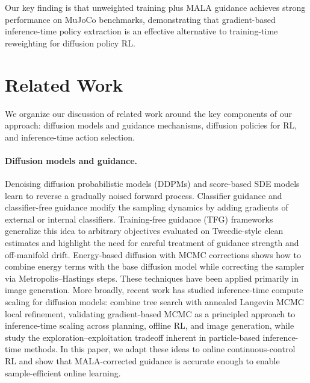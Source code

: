 \documentclass{article}
\theoremstyle{plain}
\theoremstyle{definition}
\theoremstyle{remark}
\begin{document}
Our key finding is that unweighted training plus MALA guidance achieves strong performance on MuJoCo benchmarks, demonstrating that gradient-based inference-time policy extraction is an effective alternative to training-time reweighting for diffusion policy RL.

\section{Related Work}
\label{sec:related}

We organize our discussion of related work around the key components of our approach: diffusion models and guidance mechanisms, diffusion policies for RL, and inference-time action selection.

\paragraph{Diffusion models and guidance.}
Denoising diffusion probabilistic models (DDPMs) \citep{ho2020denoising} and score-based SDE models \citep{song2021sde} learn to reverse a gradually noised forward process.
Classifier guidance \citep{dhariwal2021beatgans} and classifier-free guidance \citep{ho2022classifierfree} modify the sampling dynamics by adding gradients of external or internal classifiers.
Training-free guidance (TFG) frameworks \citep{ye2024tfg,bansal2023universal} generalize this idea to arbitrary objectives evaluated on Tweedie-style clean estimates and highlight the need for careful treatment of guidance strength and off-manifold drift.
Energy-based diffusion with MCMC corrections \citep{du2023reduce_reuse_recycle} shows how to combine energy terms with the base diffusion model while correcting the sampler via Metropolis--Hastings steps.
These techniques have been applied primarily in image generation.
More broadly, recent work has studied inference-time compute scaling for diffusion models: \citet{zhang2025inference} combine tree search with annealed Langevin MCMC local refinement, validating gradient-based MCMC as a principled approach to inference-time scaling across planning, offline RL, and image generation, while \citet{su2025navigating} study the exploration--exploitation tradeoff inherent in particle-based inference-time methods.
In this paper, we adapt these ideas to online continuous-control RL and show that MALA-corrected guidance is accurate enough to enable sample-efficient online learning.
\end{document}

